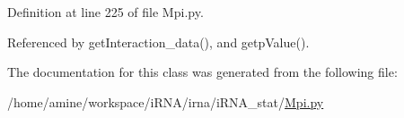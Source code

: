 \hypertarget{classirna_1_1iRNA__stat_1_1Mpi_1_1Mpi_ad47348b2098c045c3a7fbe01ed129f0a}{
\subsubsection[{setdata}]{}}
\label{classirna_1_1iRNA__stat_1_1Mpi_1_1Mpi_ad47348b2098c045c3a7fbe01ed129f0a}


\-Definition at line 225 of file \-Mpi.\-py.



\-Referenced by get\-Interaction\-\_\-data(), and getp\-Value().



\-The documentation for this class was generated from the following file\-:\begin{DoxyCompactItemize}
\item 
/home/amine/workspace/i\-R\-N\-A/irna/i\-R\-N\-A\-\_\-stat/\hyperlink{iRNA__stat_2Mpi_8py}{\-Mpi.\-py}\end{DoxyCompactItemize}
